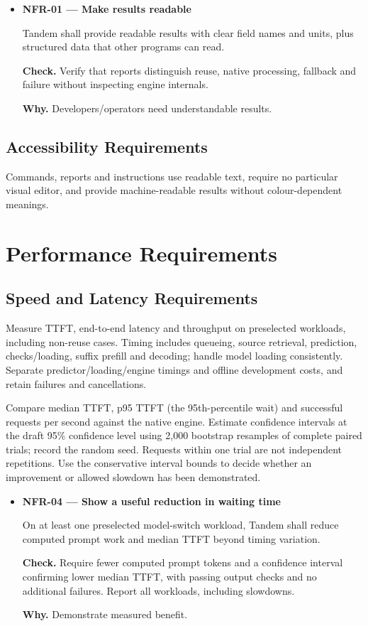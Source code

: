 \documentclass[12pt]{article}
\begin{document}
\begin{itemize}
\item {}\label{req:NFR-01}
\textbf{NFR-01 --- Make results readable}\par
Tandem shall provide readable results with clear field names and units, plus structured data that other programs can read.\par
\textbf{Check.} Verify that reports distinguish reuse, native processing, fallback and failure without inspecting engine internals.\par
\textbf{Why.} Developers/operators need understandable results.
\end{itemize}


\subsection{Accessibility Requirements}
Commands, reports and instructions use readable text, require no particular
visual editor, and provide machine-readable results without colour-dependent meanings.


\section{Performance Requirements}


\subsection{Speed and Latency Requirements}
\label{sec:performance}
Measure TTFT, end-to-end latency and throughput on preselected workloads,
including non-reuse cases. Timing includes queueing, source retrieval,
prediction, checks/loading, suffix prefill and decoding; handle model loading
consistently. Separate predictor/loading/engine timings and offline development
costs, and retain failures and cancellations.

Compare median TTFT, p95 TTFT (the 95th-percentile wait) and successful
requests per second against the native engine. Estimate confidence
intervals at the draft 95\% confidence level using 2,000 bootstrap resamples
of complete paired trials; record the random seed. Requests within one trial are not independent
repetitions. Use the conservative interval bounds to decide whether an
improvement or allowed slowdown has been demonstrated.

\begin{itemize}
\item {}\label{req:NFR-04}
\textbf{NFR-04 --- Show a useful reduction in waiting time}\par
On at least one preselected model-switch workload, Tandem shall reduce computed prompt work and median TTFT beyond timing variation.\par
\textbf{Check.} Require fewer computed prompt tokens and a confidence interval confirming lower median TTFT, with passing output checks and no additional failures. Report all workloads, including slowdowns.\par
\textbf{Why.} Demonstrate measured benefit.
\end{itemize}
\end{document}
